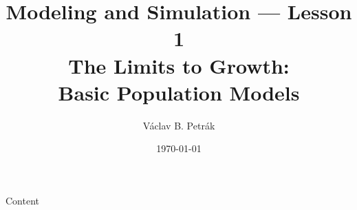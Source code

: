 \documentclass[11pt]{beamer}
\title{Modeling and Simulation --- Lesson 1\\
\textbf{The Limits to Growth:\\
Basic Population Models}}
\author{Václav B. Petrák}
\institute{Faculty of Biomedical Engineering\\
Czech Technical University in Prague}
\date{\today}
\begin{document}
\begin{frame}
  \titlepage
\end{frame}

\begin{frame}{Content}
    \tableofcontents 
\end{frame}

 
 
 

\end{document}
